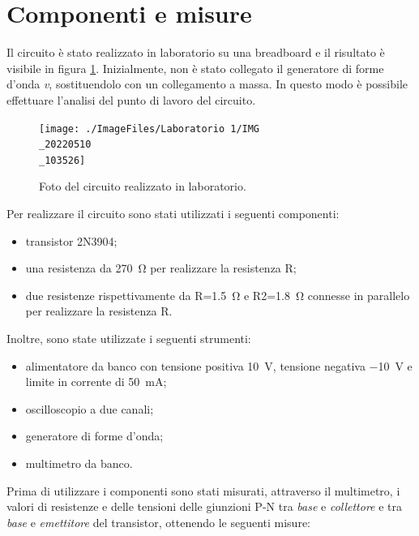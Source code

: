 \section{Componenti e misure}
Il circuito è stato realizzato in laboratorio su una breadboard e il risultato è visibile in figura \ref{fig:emitterfollwer_circuito}. Inizialmente, non è stato collegato il generatore di forme d'onda \textit{v}, sostituendolo con un collegamento a massa. In questo modo è possibile effettuare l'analisi del punto di lavoro del circuito.
\begin{figure}[h!]
	\centering
	\texttt{[image: ./ImageFiles/Laboratorio 1/IMG\\\_20220510\\\_103526]}
	\caption{Foto del circuito realizzato in laboratorio.}
	\label{fig:emitterfollwer_circuito}
\end{figure}

Per realizzare il circuito sono stati utilizzati i seguenti componenti: 
\begin{itemize}
	\item transistor 2N3904;
	\item una resistenza da \SI{270}{\ohm} per realizzare la resistenza R;
	\item due resistenze rispettivamente da R=\SI{1.5}{\ohm} e R2=\SI{1.8}{\ohm} connesse in parallelo per realizzare la resistenza R.
\end{itemize}
Inoltre, sono state utilizzate i seguenti strumenti:
\begin{itemize}
	\item alimentatore da banco con tensione positiva \SI{10}{\volt}, tensione negativa \SI{-10}{\volt} e limite in corrente di \SI{50}{\milli\ampere};
	\item oscilloscopio a due canali;
	\item generatore di forme d'onda;
	\item multimetro da banco.
\end{itemize}

Prima di utilizzare i componenti sono stati misurati, attraverso il multimetro, i valori di resistenze e delle tensioni delle giunzioni P-N tra \textit{base} e \textit{collettore} e tra \textit{base} e \textit{emettitore} del transistor, ottenendo le seguenti misure:

